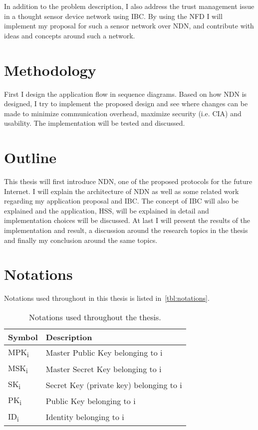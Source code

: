 In addition to the problem description, I also address the trust management issue in a thought sensor device network using \gls{IBC}.
By using the \gls{NFD} I will implement my proposal for such a sensor network over \gls{NDN}, and contribute with ideas and concepts around such a network.

\section{Methodology}

First I design the application flow in sequence diagrams.
Based on how \gls{NDN} is designed, I try to implement the proposed design and see where changes can be made to minimize communication overhead, maximize security (i.e. \gls{CIA}) and usability.
The implementation will be tested and discussed.

\section{Outline}

This thesis will first introduce \gls{NDN}, one of the proposed protocols for the future Internet.
I will explain the architecture of \gls{NDN} as well as some related work regarding my application proposal and \gls{IBC}. 
The concept of \gls{IBC} will also be explained and the application, \gls{HSS}, will be explained in detail and implementation choices will be discussed.
At last I will present the results of the implementation and result, a discussion around the research topics in the thesis and finally my conclusion around the same topics.

\section{Notations}
Notations used throughout in this thesis is listed in~\autoref{tbl:notations}.
\begin{table}[h]
  \begin{tabular}[c]{p{}p{}}
  \hline
  Symbol                    & Description                               \\ \hline
  MPK\textsubscript{i}      & Master Public Key belonging to i          \\ %
  MSK\textsubscript{i}      & Master Secret Key belonging to i          \\ %
  SK\textsubscript{i}       & Secret Key (private key) belonging to i   \\ %
  PK\textsubscript{i}       & Public Key belonging to i                 \\ %
  ID\textsubscript{i}       & Identity belonging to i                   \\ %
  \end{tabular}
  \caption{Notations used throughout the thesis.}
  \label{tbl:notations}
\end{table}
